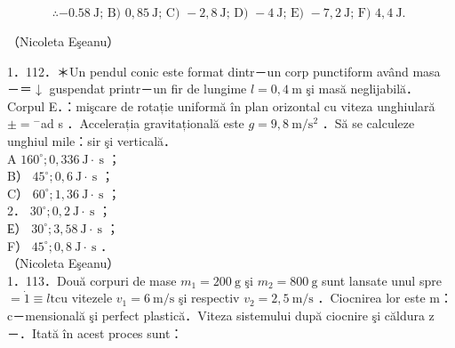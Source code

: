 \documentclass[10pt]{article}
\begin{document}
$$
\therefore-0.58 \mathrm{~J} \text {; B) } 0,85 \mathrm{~J} \text {; C) }-2,8 \mathrm{~J} \text {; D) }-4 \mathrm{~J} \text {; E) }-7,2 \mathrm{~J} \text {; F) } 4,4 \mathrm{~J} \text {. }
$$

（Nicoleta Eşeanu）

1．112．＊Un pendul conic este format dintr－un corp punctiform având masa －＝$\downarrow$ guspendat printr－un fir de lungime $l=0,4 \mathrm{~m}$ şi masă neglijabilă．Corpul E．：mişcare de rotație uniformă în plan orizontal cu viteza unghiulară $\pm={ }^{-}$ad s ．Accelerația gravitațională este $g=9,8 \mathrm{~m} / \mathrm{s}^{2}$ ．Să se calculeze unghiul mile：sir şi verticală．\\
A $160^{\circ} ; 0,336 \mathrm{~J} \cdot \mathrm{~s}$ ；\\
B） $45^{\circ} ; 0,6 \mathrm{~J} \cdot \mathrm{~s}$ ；\\
C） $60^{\circ} ; 1,36 \mathrm{~J} \cdot \mathrm{~s}$ ；\\
2． $30^{\circ} ; 0,2 \mathrm{~J} \cdot \mathrm{~s}$ ；\\
Е） $30^{\circ} ; 3,58 \mathrm{~J} \cdot \mathrm{~s}$ ；\\
F） $45^{\circ} ; 0,8 \mathrm{~J} \cdot \mathrm{~s}$ ．\\
（Nicoleta Eşeanu）\\
1．113．Două corpuri de mase $m_{1}=200 \mathrm{~g}$ şi $m_{2}=800 \mathrm{~g}$ sunt lansate unul spre $=\dot{1} \equiv l \mathrm{t} \mathrm{cu}$ vitezele $v_{1}=6 \mathrm{~m} / \mathrm{s}$ şi respectiv $v_{2}=2,5 \mathrm{~m} / \mathrm{s}$ ．Ciocnirea lor este m：c－mensională şi perfect plastică．Viteza sistemului după ciocnire şi căldura z－．Itată în acest proces sunt：
\end{document}
